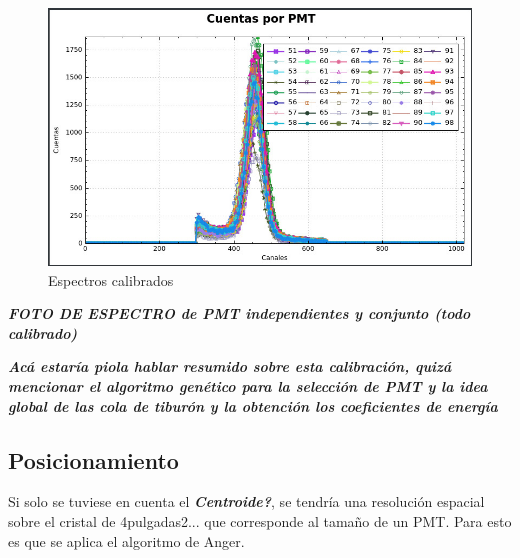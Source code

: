 \documentclass[conference]{IEEEtran}
\begin{document}
\begin{figure}[h]
\centering
\includegraphics[scale=0.2]{Espectro_Calibrado.jpeg}
\caption{Espectros calibrados}
\label{fig:Espectros calibrados}
\end{figure}

\textbf{\textit{FOTO DE ESPECTRO de PMT independientes y conjunto (todo calibrado)}
}%

\textbf{\textit{Acá estaría piola hablar resumido sobre esta calibración, quizá mencionar el algoritmo genético para la selección de PMT y la idea global de las cola de tiburón y la obtención los coeficientes de energía}}

\subsection{Posicionamiento}

Si solo se tuviese en cuenta el \textit{\textbf{Centroide?}}, se tendría una resolución espacial sobre el cristal de 4pulgadas2... que corresponde al tamaño de un PMT. Para esto es que se aplica el algoritmo de Anger.

\end{document}
